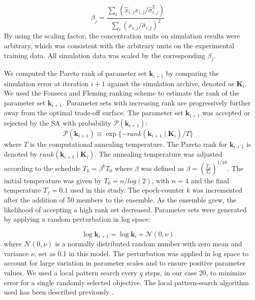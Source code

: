 \documentclass[12pt]{article}
\begin{document}
\begin{equation}
\beta_j = \frac{\sum_{i}(\hat{x}_{i,j}x_{i,j}/\hat{\sigma}_{i,j}^2)}{\sum_{i}(x_{i,j}/\hat{\sigma}_{i,j})^2}
\end{equation} 
By using the scaling factor, the concentration units on simulation results were arbitrary, which was consistent with the arbitrary units on the experimental training data. All simulation data was scaled by the corresponding $\beta_j$. 

We computed the Pareto rank of parameter set $\mathbf{k}_{i+1}$ by comparing the simulation error at iteration $i+1$ against the simulation archive, denoted as $\mathbf{K}_i$. We used the Fonseca and Fleming ranking scheme \cite{Fonseca1993} to estimate the rank of the parameter set $\mathbf{k}_{i+1}$. Parameter sets with increasing rank are progressively further away from the optimal trade-off surface. The parameter set $\mathbf{k}_{i+1}$ was accepted or rejected by the SA with probability $\mathcal{P}\left(\mathbf{k}_{i+1}\right)$: 
\begin{equation}\label{eqn_costMOSA}
\mathcal{P}(\mathbf{k}_{i+1}) \equiv \exp{\{-rank\left(\mathbf{k}_{i+1} \mid \mathbf{K}_{i} \right)/T\}}
\end{equation}
where $T$ is the computational annealing temperature. The Pareto rank for $\mathbf{k}_{i+1}$ is denoted by $rank\left(\mathbf{k}_{i+1}\mid \mathbf{K}_{i}\right)$. The annealing temperature was  adjusted according to the schedule
$T_k = \beta^k T_0$
where $\beta$ was defined as $\beta = \left(\frac{T_{f}}{T_{o}}\right)^{1/10}$. The initial temperature was given by $T_0 = n/log(2)$, with $n=4$ and the final temperature $T_f = 0.1$ used in this study.
The epoch-counter $k$ was incremented after the addition of 50 members to the ensemble. As the ensemble grew, the likelihood of accepting a high rank set decreased. Parameter sets were generated by applying a random perturbation in log space: 

\begin{equation}
\log\mathbf{k}_{i+1} = \log\mathbf{k}_i + \mathcal{N}(0,\nu)
\end{equation}
where $\mathcal{N}(0,\nu)$ is a normally distributed random number with zero mean and variance $\nu$, set as 0.1 in this model. The perturbation was applied in log space to account for large variation in parameter scales and to ensure positive parameter values. We used a local pattern search every $q$ steps, in our case 20, to minimize error for a single randomly selected objective. The local pattern-search algorithm used has been described previously \cite{Gadkar2003}.
\end{document}

